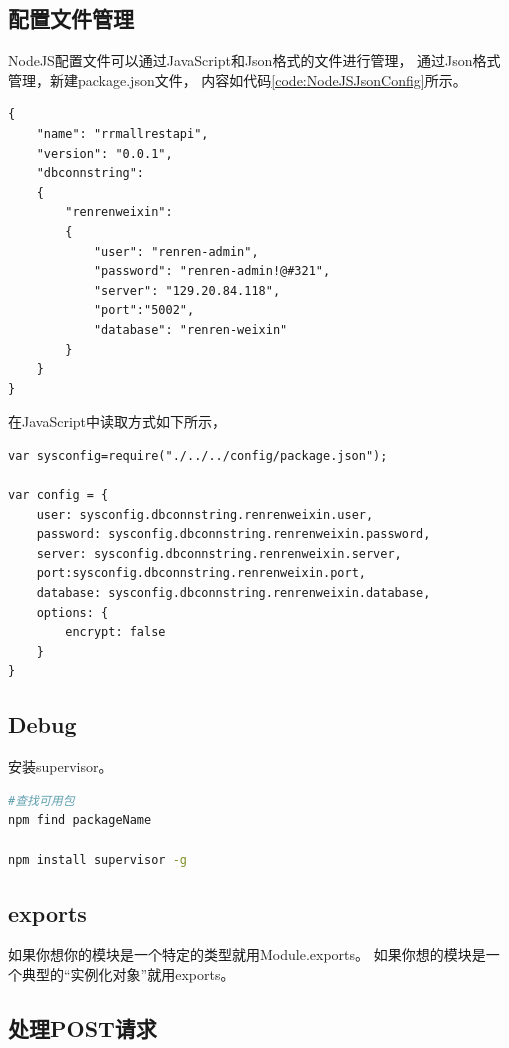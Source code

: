 \documentclass{book}
\begin{document}
\subsection{配置文件管理}

NodeJS配置文件可以通过JavaScript和Json格式的文件进行管理，
通过Json格式管理，新建package.json文件，
内容如代码\ref{code:NodeJSJsonConfig}所示。

\begin{lstlisting}[language={[Sharp]C},caption=NodeJS json格式配置,label={code:NodeJSJsonConfig}]
{
    "name": "rrmallrestapi",
    "version": "0.0.1",
    "dbconnstring":
    {
        "renrenweixin":
        {
            "user": "renren-admin",
            "password": "renren-admin!@#321",
            "server": "129.20.84.118",
            "port":"5002",
            "database": "renren-weixin"
        }        
    }
}
\end{lstlisting}

在JavaScript中读取方式如下所示，

\begin{lstlisting}[language=VBScript]
var sysconfig=require("./../../config/package.json");

var config = {
    user: sysconfig.dbconnstring.renrenweixin.user,
    password: sysconfig.dbconnstring.renrenweixin.password,
    server: sysconfig.dbconnstring.renrenweixin.server, 
    port:sysconfig.dbconnstring.renrenweixin.port,
    database: sysconfig.dbconnstring.renrenweixin.database,
    options: {
        encrypt: false
    }
}
\end{lstlisting}

\subsection{Debug}

安装supervisor。

\begin{lstlisting}[language=Bash]
#查找可用包
npm find packageName

npm install supervisor -g
\end{lstlisting}

\subsection{exports}

如果你想你的模块是一个特定的类型就用Module.exports。
如果你想的模块是一个典型的“实例化对象”就用exports。

\subsection{处理POST请求}
\end{document}
